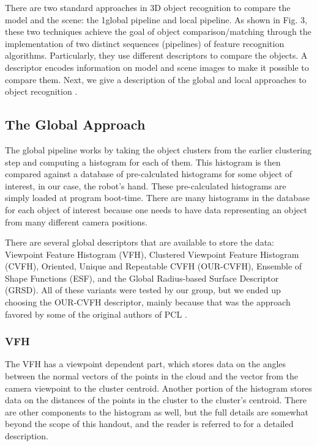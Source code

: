 \documentclass[journal]{IEEEtran}
\begin{document}
There are  two standard approaches in 3D object recognition to compare the model and the scene: the 1global pipeline and local pipeline. As shown in Fig. 3, these two techniques achieve the goal of object comparison/matching through the implementation of two distinct sequences (pipelines) of feature recognition algorithms. Particularly, they use different descriptors to compare the objects. A descriptor encodes information on model and scene images to make it possible to compare them. 
Next, we give a description of the global and local approaches to object recognition .
\subsection{The Global Approach}
The global pipeline works by taking the object clusters from the earlier clustering step and computing a histogram for each of them.  This histogram is then compared against a database of pre-calculated histograms for some object of interest, in our case, the robot's hand.  These pre-calculated histograms are simply loaded at program boot-time.  There are many histograms in the database for each object of interest because one needs to have data representing an object from many different camera positions.

There are several global descriptors that are available to store the data: Viewpoint Feature Histogram (VFH), Clustered Viewpoint Feature Histogram (CVFH), Oriented, Unique and Repeatable CVFH (OUR-CVFH), Ensemble of Shape Functions (ESF), and the Global Radius-based Surface Descriptor (GRSD).  All of these variants were tested by our group, but we ended up choosing the OUR-CVFH descriptor, mainly because that was the approach favored by some of the original authors of PCL \cite{aldoma4}.


\subsubsection{VFH}
The VFH has a viewpoint dependent part, which stores data on the angles between the normal vectors of the points in the cloud and the vector from the camera viewpoint to the cluster centroid.  Another portion of the histogram stores data on the distances of the points in the cluster to the cluster’s centroid.  There are other components to the histogram as well, but the full details are somewhat beyond the scope of this handout, and the reader is referred to \cite{aldoma2} for a detailed description. 
\end{document}
